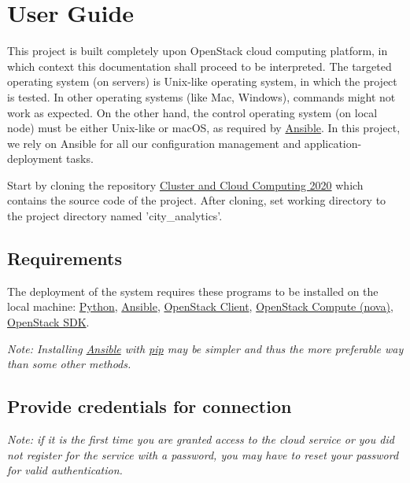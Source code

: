 \section{User Guide}
This project is built completely upon OpenStack cloud computing platform, in which context this documentation shall proceed to be interpreted. The targeted operating system (on servers) is Unix-like operating system, in which the project is tested. In other operating systems (like Mac, Windows), commands might not work as expected. On the other hand, the control operating system (on local node) must be either Unix-like or macOS, as required by \href{https://docs.ansible.com/ansible/latest/installation_guide/intro_installation.html}{Ansible}. In this project, we rely on Ansible for all our configuration management and application-deployment tasks.  

Start by cloning the repository \href{https://github.com/nxv1987/UniMelb---Cluster-and-Cloud-Computing-COMP90024-2020-SM1}{Cluster and Cloud Computing 2020} which contains the source code of the project. After cloning, set working directory to the project directory named 'city\_analytics'.  

\subsection{Requirements}
The deployment of the system requires these programs to be installed on the local machine: \href{https://www.python.org/}{Python}, \href{https://docs.ansible.com/ansible/latest/installation_guide/intro_installation.html}{Ansible}, \href{https://docs.openstack.org/newton/user-guide/common/cli-install-openstack-command-line-clients.html}{OpenStack Client}, \href{https://docs.openstack.org/nova/latest/#installation}{OpenStack Compute (nova)}, \href{https://docs.openstack.org/openstacksdk/latest/user/}{OpenStack SDK}.  

\textit{Note: Installing \href{https://docs.ansible.com/ansible/latest/installation_guide/intro_installation.html}{Ansible} with \href{https://pip.pypa.io/en/stable/}{pip} may be simpler and thus the more preferable way than some other methods.}  

\subsection{Provide credentials for connection}
\textit{Note: if it is the first time you are granted access to the cloud service or you did not register for the service with
a password, you may have to reset your password for valid authentication.}  

